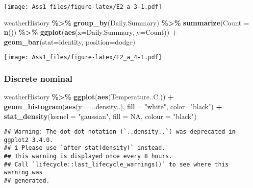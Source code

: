\documentclass[
]{article}
\newenvironment{Shaded}{\begin{snugshade}}{\end{snugshade}}
\newcommand{\AttributeTok}[1]{\textcolor[rgb]{0.13,0.29,0.53}{#1}}
\newcommand{\ConstantTok}[1]{\textcolor[rgb]{0.56,0.35,0.01}{#1}}
\newcommand{\FunctionTok}[1]{\textcolor[rgb]{0.13,0.29,0.53}{\textbf{#1}}}
\newcommand{\NormalTok}[1]{#1}
\newcommand{\SpecialCharTok}[1]{\textcolor[rgb]{0.81,0.36,0.00}{\textbf{#1}}}
\newcommand{\StringTok}[1]{\textcolor[rgb]{0.31,0.60,0.02}{#1}}
\begin{document}
\texttt{[image: Ass1\_files/figure-latex/E2\_a\_3-1.pdf]}

\begin{Shaded}
\begin{Highlighting}[]
\NormalTok{weatherHistory }\SpecialCharTok{\%\textgreater{}\%}
  \FunctionTok{group\_by}\NormalTok{(Daily.Summary) }\SpecialCharTok{\%\textgreater{}\%}
  \FunctionTok{summarize}\NormalTok{(}\AttributeTok{Count =} \FunctionTok{n}\NormalTok{()) }\SpecialCharTok{\%\textgreater{}\%}
  \FunctionTok{ggplot}\NormalTok{(}\FunctionTok{aes}\NormalTok{(}\AttributeTok{x=}\NormalTok{Daily.Summary, }\AttributeTok{y=}\NormalTok{Count)) }\SpecialCharTok{+}
  \FunctionTok{geom\_bar}\NormalTok{(}\AttributeTok{stat=}\StringTok{\textquotesingle{}identity\textquotesingle{}}\NormalTok{, }\AttributeTok{position=}\StringTok{\textquotesingle{}dodge\textquotesingle{}}\NormalTok{)}
\end{Highlighting}
\end{Shaded}

\texttt{[image: Ass1\_files/figure-latex/E2\_a\_4-1.pdf]}

\subsubsection{Discrete nominal}\label{discrete-nominal}

\begin{Shaded}
\begin{Highlighting}[]
\NormalTok{weatherHistory }\SpecialCharTok{\%\textgreater{}\%}
  \FunctionTok{ggplot}\NormalTok{(}\FunctionTok{aes}\NormalTok{(Temperature..C.)) }\SpecialCharTok{+}
  \FunctionTok{geom\_histogram}\NormalTok{(}\FunctionTok{aes}\NormalTok{(}\AttributeTok{y =}\NormalTok{ ..density..), }\AttributeTok{fill =} \StringTok{"white"}\NormalTok{, }\AttributeTok{color=}\StringTok{"black"}\NormalTok{) }\SpecialCharTok{+}
  \FunctionTok{stat\_density}\NormalTok{(}\AttributeTok{kernel =} \StringTok{"gaussian"}\NormalTok{, }\AttributeTok{fill =} \ConstantTok{NA}\NormalTok{, }\AttributeTok{colour =} \StringTok{"black"}\NormalTok{)}
\end{Highlighting}
\end{Shaded}

\begin{verbatim}
## Warning: The dot-dot notation (`..density..`) was deprecated in ggplot2 3.4.0.
## i Please use `after_stat(density)` instead.
## This warning is displayed once every 8 hours.
## Call `lifecycle::last_lifecycle_warnings()` to see where this warning was
## generated.
\end{verbatim}
\end{document}
